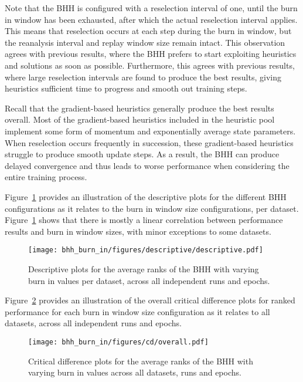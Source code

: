 Note that the \acs{BHH} is configured with a reselection interval of one, until the burn in window has been exhausted, after which the actual reselection interval applies. This means that reselection occurs at each step during the burn in window, but the reanalysis interval and replay window size remain intact. This observation agrees with previous results, where the \acs{BHH} prefers to start exploiting heuristics and solutions as soon as possible. Furthermore, this agrees with previous results, where large reselection intervals are found to produce the best results, giving heuristics sufficient time to progress and smooth out training steps.

Recall that the gradient-based heuristics generally produce the best results overall. Most of the gradient-based heuristics included in the heuristic pool implement some form of momentum and exponentially average state parameters. When reselection occurs frequently in succession, these gradient-based heuristics struggle to produce smooth update steps. As a result, the \acs{BHH} can produce delayed convergence and thus leads to worse performance when considering the entire training process.

Figure~\ref{fig:results:burn_in:descriptive:descriptive} provides an illustration of the descriptive plots for the different \acs{BHH} configurations as it relates to the burn in window size configurations, per dataset. Figure~\ref{fig:results:burn_in:descriptive:descriptive} shows that there is mostly a linear correlation between performance results and burn in window sizes, with minor exceptions to some datasets.

\begin{figure}[htb]
      \centering
      \texttt{[image: bhh\_burn\_in/figures/descriptive/descriptive.pdf]}
      \caption{Descriptive plots for the average ranks of the \acs{BHH} with varying burn in values per dataset, across all independent runs and epochs.}
      \label{fig:results:burn_in:descriptive:descriptive}
\end{figure}

Figure~\ref{fig:results:burn_in:descriptive:cd} provides an illustration of the overall critical difference plots for ranked performance for each burn in window size configuration as it relates to all datasets, across all independent runs and epochs.

\begin{figure}[htb]
      \centering
      \texttt{[image: bhh\_burn\_in/figures/cd/overall.pdf]}
      \caption{Critical difference plots for the average ranks of the \acs{BHH} with varying burn in values across all datasets, runs and epochs.}
      \label{fig:results:burn_in:descriptive:cd}
\end{figure}

